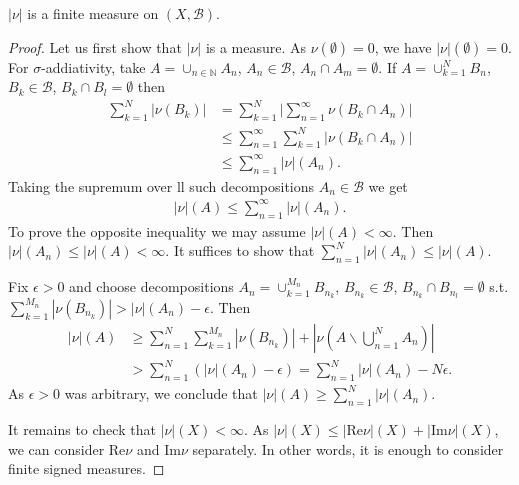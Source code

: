 \begin{proposition}
    \(|\nu|\) is a finite measure on \((X,\mathscr{B})\).
\end{proposition}
\ifdetailed
\begin{proof}
    Let us first show that \(|\nu|\) is a measure. As \(\nu(\emptyset)=0\), we have \(|\nu|(\emptyset)=0\). For \(\sigma\)-addiativity, take \(A=\cup_{n\in\mathbb{N}}A_n\), \(A_n\in\mathscr{B}\), \(A_n\cap A_m = \emptyset\). If \(A=\cup_{k=1}^{N}B_n\), \(B_k\in\mathscr{B}\), \(B_k\cap B_l = \emptyset\) then
    \begin{align*}
        \sum\limits_{k=1}^{N}|\nu(B_k)| &= \sum\limits_{k=1}^{N}\vert \sum\limits_{n=1}^{\infty}\nu\left(B_k\cap A_n\right)\vert \\
        &\leq \sum\limits_{n=1}^{\infty}\sum\limits_{k=1}^{N} \vert \nu\left(B_k\cap A_n\right) \vert \\ 
        &\leq \sum\limits_{n=1}^{\infty}\vert \nu\vert(A_n).
    \end{align*}
    Taking the supremum over ll such decompositions \(A_n\in\mathscr{B}\) we get
    \begin{align*}
        |\nu|(A) \leq \sum\limits_{n=1}^{\infty}|\nu|(A_n).
    \end{align*}
    To prove the opposite inequality we may assume \(|\nu|(A)<\infty\). Then \(|\nu|(A_n)\leq |\nu|(A)<\infty\). It suffices to show that \(\sum_{n=1}^{N}|\nu|(A_n)\leq |\nu|(A)\).

    Fix \(\epsilon>0\) and choose decompositions \(A_n=\cup_{k=1}^{M_n}B_{n_k}\), \(B_{n_k}\in\mathscr{B}\), \(B_{n_k}\cap B_{n_l}=\emptyset\) s.t. \(\sum_{k=1}^{M_n}|\nu(B_{n_k})| > |\nu|(A_n) - \epsilon\). Then
    \begin{align*}
        |\nu|(A) &\geq \sum\limits_{n=1}^{N}\sum\limits_{k=1}^{M_n}|\nu(B_{n_k})| + |\nu\left(A\backslash \bigcup\limits_{n=1}^{N}A_n\right)| \\
        &> \sum\limits_{n=1}^{N} \left(|\nu|(A_n) - \epsilon\right)
        = \sum\limits_{n=1}^{N}|\nu|(A_n) - N\epsilon.
    \end{align*}
    As \(\epsilon>0\) was arbitrary, we conclude that \(|\nu|(A)\geq \sum_{n=1}^{N}|\nu|(A_n)\).

    It remains to check that \(|\nu|(X)<\infty\). As \(|\nu|(X) \leq |\text{Re}\nu|(X) + |\text{Im}\nu|(X)\), we can consider Re\(\nu\) and Im\(\nu\) separately. In other words, it is enough to consider finite signed measures.


\end{proof}
